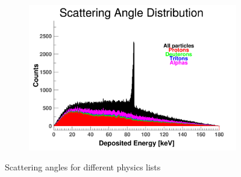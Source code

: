 \documentclass[10pt,a4paper]{report}
\begin{document}
\begin{figure}[htbp]
    \begin{subfigure}[htbp]{0.42\textwidth}
        \label{fig:A7}
        \includegraphics[width=\textwidth]{./A7_ShieldingM_Scat.png}
    \end{subfigure}
    \caption{Scattering angles for different physics lists}
    \label{fig:Alpha}
\end{figure}

\end{document}
